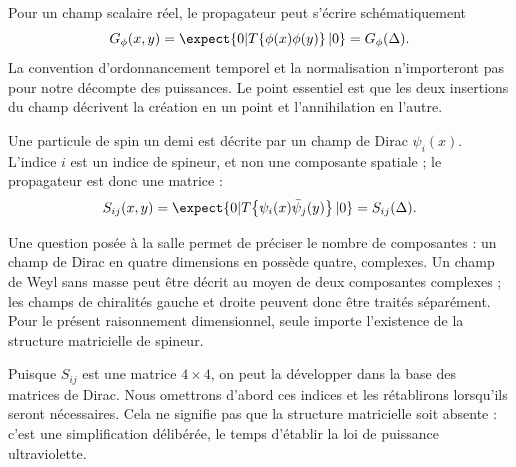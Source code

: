 Pour un champ scalaire réel, le propagateur peut s’écrire schématiquement
\begin{equation}
G_\phi(x,y)=\expect{0|T\!\left\{\phi(x)\phi(y)\right\}|0}
=G_\phi(\Delta).
\end{equation}
La convention d’ordonnancement temporel et la normalisation n’importeront pas pour notre décompte des puissances. Le point essentiel est que les deux insertions du champ décrivent la création en un point et l’annihilation en l’autre.

\begin{classroomqa}
\end{classroomqa}

Une particule de spin un demi est décrite par un champ de Dirac \(\psi_i(x)\). L’indice \(i\) est un indice de spineur, et non une composante spatiale ; le propagateur est donc une matrice :
\begin{equation}
S_{ij}(x,y)=\expect{0|T\!\left\{\psi_i(x)\bar\psi_j(y)\right\}|0}
=S_{ij}(\Delta).
\end{equation}

Une question posée à la salle permet de préciser le nombre de composantes : un champ de Dirac en quatre dimensions en possède quatre, complexes. Un champ de Weyl sans masse peut être décrit au moyen de deux composantes complexes ; les champs de chiralités gauche et droite peuvent donc être traités séparément. Pour le présent raisonnement dimensionnel, seule importe l’existence de la structure matricielle de spineur.

Puisque \(S_{ij}\) est une matrice \(4\times4\), on peut la développer dans la base des matrices de Dirac. Nous omettrons d’abord ces indices et les rétablirons lorsqu’ils seront nécessaires. Cela ne signifie pas que la structure matricielle soit absente : c’est une simplification délibérée, le temps d’établir la loi de puissance ultraviolette.

\begin{classroomqa}
\end{classroomqa}

